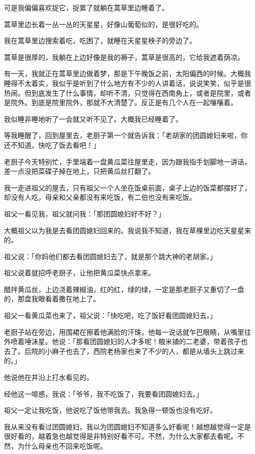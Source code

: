 \documentclass[UTF8]{ctexart}
\begin{document}
可是我偏偏喜欢捉它，捉累了就躺在蒿草里边睡着了。

蒿草里边长着一丛一丛的天星星，好像山葡萄似的，是很好吃的。

我在蒿草里边搜索着吃，吃困了，就睡在天星星秧子的旁边了。

蒿草是很厚的，我躺在上边好像是我的褥子，蒿草是很高的，它给我遮着荫凉。

有一天，我就正在蒿草里边做着梦，那是下午晚饭之前，太阳偏西的时候。大概我睡得不太着实，我似乎是听到了什么地方有不少的人讲着话，说说笑笑，似乎是很热闹。但到底发生了什么事情，却听不清，只觉得在西南角上，或者是院里，或者是院外。到底是院里院外，那就不大清楚了。反正是有几个人在一起嚷嚷着。

我似睡非睡地听了一会就又听不见了。大概我已经睡着了。

等我睡醒了，回到屋里去，老厨子第一个就告诉我：「老胡家的团圆媳妇来啦，你还不知道，快吃了饭去看吧！」

老厨子今天特别忙，手里端着一盘黄瓜菜往屋里走，因为跟我指手划脚地一讲话，差一点没把菜碟子掉在地上，只把黄瓜丝打翻了。

我一走进祖父的屋去，只有祖父一个人坐在饭桌前面，桌子上边的饭菜都摆好了，却没有人吃，母亲和父亲都没有来吃饭，有二伯也没有来吃饭。

祖父一看见我，祖父就问我：「那团圆媳妇好不好？」

大概祖父以为我是去看团圆媳妇回来的。我说我不知道，我在草棵里边吃天星星来的。

祖父说：「你妈他们都去看团圆媳妇去了，就是那个跳大神的老胡家。」

祖父说着就招呼老厨子，让他把黄瓜菜快点拿来。

醋拌黄瓜丝，上边浇着辣椒油，红的红，绿的绿，一定是那老厨子又重切了一盘的，那盘我眼看着撒在地上了。

祖父一看黄瓜菜也来了，祖父说：「快吃吧，吃了饭好看团圆媳妇去。」

老厨子站在旁边，用围裙在擦着他满脸的汗珠，他每一说话就乍巴眼睛，从嘴里往外喷着唾沫星。他说：「那看团圆媳妇的人才多呢！粮米铺的二老婆，带着孩子也去了。后院的小麻子也去了，西院老杨家也来了不少的人，都是从墙头上跳过来的。」

他说他在井沿上打水看见的。

经他这一喧惑，我说：「爷爷，我不吃饭了，我要看团圆媳妇去。」

祖父一定让我吃饭，他说吃了饭他带我去。我急得一顿饭也没有吃好。

我从来没有看过团圆媳妇，我以为团圆媳妇不知道多么好看呢！越想越觉得一定是很好看的，越着急也越觉得是非特别好看不可。不然，为什么大家都去看呢。不然，为什么母亲也不回来吃饭呢。
\end{document}
